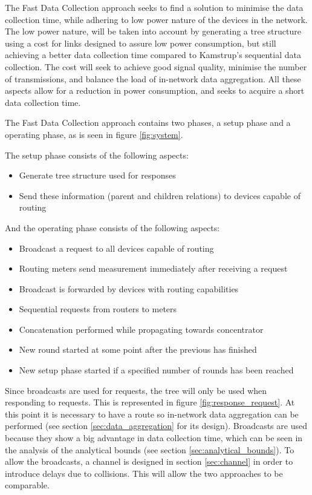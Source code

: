 The Fast Data Collection approach seeks to find a solution to minimise the data collection time, while adhering to low power nature of the devices in the network. The low power nature, will be taken into account by generating a tree structure using a cost for links designed to assure low power consumption, but still achieving a better data collection time compared to Kamstrup's sequential data collection. The cost will seek to achieve good signal quality, minimise the number of transmissions, and balance the load of in-network data aggregation. All these aspects allow for a reduction in power consumption, and seeks to acquire a short data collection time.

The Fast Data Collection approach contains two phases, a setup phase and a operating phase, as is seen in figure \ref{fig:system}.

The setup phase consists of the following aspects:
\begin{itemize}
\item Generate tree structure used for responses
\item Send these information (parent and children relations) to devices capable of routing
\end{itemize}
And the operating phase consists of the following aspects:
\begin{itemize}
\item Broadcast a request to all devices capable of routing
\item Routing meters send measurement immediately after receiving a request
\item Broadcast is forwarded by devices with routing capabilities
\item Sequential requests from routers to meters
\item Concatenation performed while propagating towards concentrator
\item New round started at some point after the previous has finished
\item New setup phase started if a specified number of rounds has been reached
\end{itemize}

Since broadcasts are used for requests, the tree will only be used when responding to requests. This is represented in figure \ref{fig:response_request}. At this point it is necessary to have a route so in-network data aggregation can be performed (see section \ref{sec:data_aggregation} for its design). Broadcasts are used because they show a big advantage in data collection time, which can be seen in the analysis of the analytical bounds (see section \ref{sec:analytical_bounds}). To allow the broadcasts, a channel is designed in section \ref{sec:channel} in order to introduce delays due to collisions. This will allow the two approaches to be comparable.


